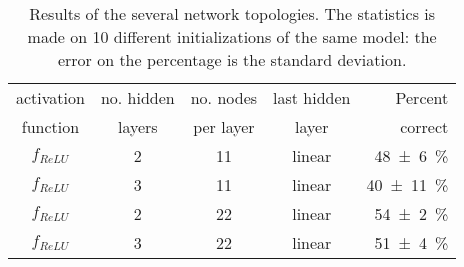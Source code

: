 \begin{table}[htbp]
	\centering
	\begin{tabular}{c c c c r}
	\toprule
	activation	& no. hidden 	& no. nodes	& last hidden	& Percent \\
	function		& layers 			& per layer	& layer				& correct \\
	\midrule
	$f_{ReLU}$ 			& 2 & 11 & linear & \SI{48 +- 6}{\percent} \\
	$f_{ReLU}$ 			& 3 & 11 & linear & \SI{40 +- 11}{\percent} \\
	$f_{ReLU}$ 			& 2 & 22 & linear & \SI{54 +- 2}{\percent} \\
	$f_{ReLU}$ 			& 3 & 22 & linear & \SI{51 +- 4}{\percent} \\
	\bottomrule
	\end{tabular}
	\caption{Results of the several network topologies.
	The statistics is made on \num{10} different initializations of the same model: the error on the percentage is the standard deviation.
	}
	\label{tab:PyResults}
\end{table}

